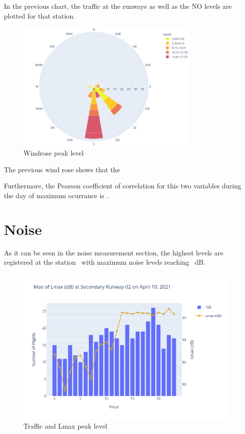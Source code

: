 \documentclass[12pt, oneside]{book}
\begin{document}
In the previous chart, the traffic at the runways as well as the NO levels are plotted for that station. 

{\begin{figure}[H]
\centering
\includegraphics[width=0.8\textwidth, keepaspectratio]{windroseNO}
\caption{Windrose  peak level}\label{windroseNO}
\end{figure}}{}

The previous wind rose shows that the \windNO

Furthermore, the Pearson coefficient of correlation for this two variables during the day of maximum ocurrance is \correlNO .


\section{Noise}

As it can be seen in the noise measurement section, the highest levels are registered at the station \stationMaxLeq\ with maximum noise levels reaching \maxNoiseValue\ dB.


{\begin{figure}[H]
\centering
\includegraphics[width=0.98\textwidth]{image21}
\caption{Traffic and Lmax peak level}\label{image21}
\end{figure}}{}
\end{document}
